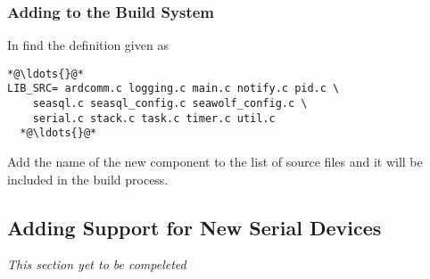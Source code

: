 \subsubsection{Adding to the Build System}
In  find the definition given as
\begin{lstlisting}[language=Cextended, caption=src/Makefile, escapeinside={{*@}{@*}}]
  *@\ldots{}@*
LIB_SRC= ardcomm.c logging.c main.c notify.c pid.c \
	seasql.c seasql_config.c seawolf_config.c \
	serial.c stack.c task.c timer.c util.c
  *@\ldots{}@*
\end{lstlisting}
Add the name of the new component to the list of source files and it will be included in the build process.

\subsection{Adding Support for New Serial Devices}
\textit{This section yet to be compeleted}
